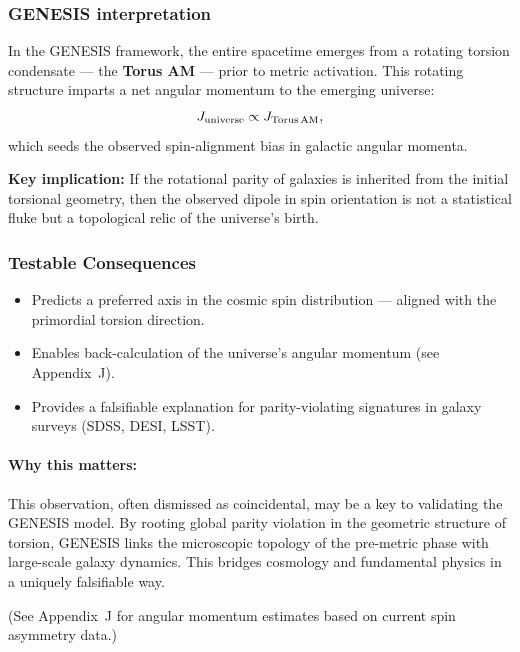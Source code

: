 \documentclass{article}
\begin{document}
\subsubsection*{GENESIS interpretation}
In the GENESIS framework, the entire spacetime emerges from a rotating torsion condensate --- the \textbf{Torus AM} --- prior to metric activation. This rotating structure imparts a net angular momentum to the emerging universe:
\begin{equation}
J_{\rm universe} \propto J_{\rm Torus\,AM},
\end{equation}
which seeds the observed spin-alignment bias in galactic angular momenta.

\textbf{Key implication:} If the rotational parity of galaxies is inherited from the initial torsional geometry, then the observed dipole in spin orientation is not a statistical fluke but a topological relic of the universe's birth.

\subsubsection*{Testable Consequences}
\begin{itemize}
  \item Predicts a preferred axis in the cosmic spin distribution --- aligned with the primordial torsion direction.
  \item Enables back-calculation of the universe’s angular momentum (see Appendix~J).
  \item Provides a falsifiable explanation for parity-violating signatures in galaxy surveys (SDSS, DESI, LSST).
\end{itemize}


\begin{tcolorbox}[colback=gray!5, colframe=black!30, title=Why this matters]

\paragraph{Why this matters:}
This observation, often dismissed as coincidental, may be a key to validating the GENESIS model. By rooting global parity violation in the geometric structure of torsion, GENESIS links the microscopic topology of the pre-metric phase with large-scale galaxy dynamics. This bridges cosmology and fundamental physics in a uniquely falsifiable way.
\end{tcolorbox}

(See Appendix~J for angular momentum estimates based on current spin asymmetry data.)
\end{document}
